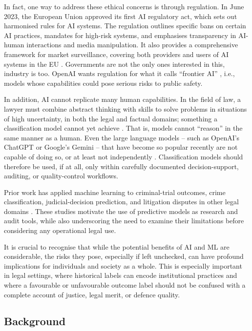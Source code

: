 \documentclass[fleqn,10pt]{wlscirep}
\begin{document}
In fact, one way to address these ethical concerns is through regulation. In June 2023, the European Union approved its first AI regulatory act, which sets out harmonised rules for AI systems. The regulation outlines specific bans on certain AI practices, mandates for high-risk systems, and emphasises transparency in AI-human interactions and media manipulation. It also provides a comprehensive framework for market surveillance, covering both providers and users of AI systems in the EU \cite{eu-52021PC0206}.  Governments are not the only ones interested in this, industry is too. OpenAI wants regulation for what it calls ``frontier AI'' \cite{anderljung2023frontier}, i.e., models whose capabilities could pose serious risks to public safety. 

In addition, AI cannot replicate many human capabilities. In the field of law, a lawyer must combine abstract thinking with skills to solve problems in situations of high uncertainty, in both the legal and factual domains; something a classification model cannot yet achieve \cite{surden2014machine}. That is, models cannot ``reason'' in the same manner as a human. Even the large language models -- such as OpenAI's ChatGPT or Google's Gemini -- that have become so popular recently are not capable of doing so, or at least not independently \cite{hao2023reasoning,wei2023chainofthought}. Classification models should therefore be used, if at all, only within carefully documented decision-support, auditing, or quality-control workflows.

Prior work has applied machine learning to criminal-trial outcomes, crime classification, judicial-decision prediction, and litigation disputes in other legal domains \cite{10.1093/lpr/mgaa003,10.1093/lpr/mgac006,Li2019,doi:10.1061/(ASCE)CP.1943-5487.0000148}. These studies motivate the use of predictive models as research and audit tools, while also underscoring the need to examine their limitations before considering any operational legal use.

It is crucial to recognise that while the potential benefits of AI and ML are considerable, the risks they pose, especially if left unchecked, can have profound implications for individuals and society as a whole. This is especially important in legal settings, where historical labels can encode institutional practices and where a favourable or unfavourable outcome label should not be confused with a complete account of justice, legal merit, or defence quality.

\subsection{Background}
\end{document}
